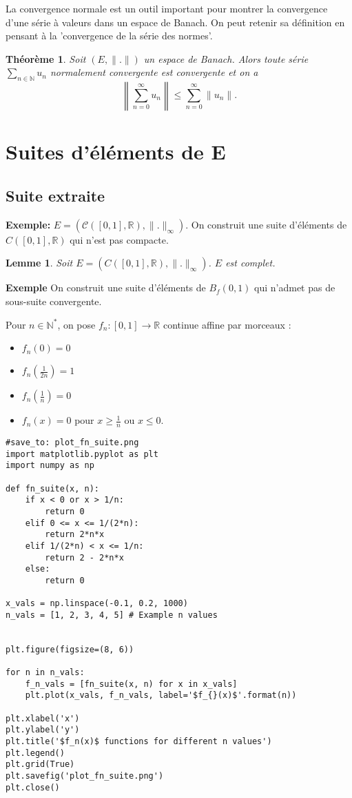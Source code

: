 \documentclass{article}
\newtheorem{theorem}{Théorème}
\newtheorem{lemma}{Lemme}
\begin{document}
La convergence normale est un outil important pour montrer la convergence d'une série à valeurs dans un espace de Banach. On peut retenir sa définition en pensant à la 'convergence de la série des normes'.

\begin{theorem}
\label{thm:normal_convergence_implies_convergence}
Soit $(E, \|.\|)$ un espace de Banach. Alors toute série $\sum_{n \in \mathbb{N}} u_n$ normalement convergente est convergente et on a
\begin{equation}
    \left\| \sum_{n=0}^\infty u_n \right\| \leq \sum_{n=0}^\infty \|u_n\|.
\end{equation}
\end{theorem}

\section{Suites d'éléments de E}
\subsection{Suite extraite}
\textbf{Exemple:} $E = (\mathcal{C}([0, 1], \mathbb{R}), \|.\|_\infty)$. On construit une suite d'éléments de $C([0, 1], \mathbb{R})$ qui n'est pas compacte.

\begin{lemma}
\label{lemma:C_complete}
Soit $E = (C([0, 1], \mathbb{R}), \|.\|_\infty)$. $E$ est complet.
\end{lemma}

\textbf{Exemple}
On construit une suite d'éléments de $B_f(0, 1)$ qui n'admet pas de sous-suite convergente.

Pour $n \in \mathbb{N}^*$, on pose $f_n : [0, 1] \rightarrow \mathbb{R}$ continue affine par morceaux :
\begin{itemize}
    \item $f_n(0) = 0$
    \item $f_n(\frac{1}{2n}) = 1$
    \item $f_n(\frac{1}{n}) = 0$
    \item $f_n(x) = 0$ pour $x \geq \frac{1}{n}$ ou $x \leq 0$.
\end{itemize}

\begin{verbatim}
#save_to: plot_fn_suite.png
import matplotlib.pyplot as plt
import numpy as np

def fn_suite(x, n):
    if x < 0 or x > 1/n:
        return 0
    elif 0 <= x <= 1/(2*n):
        return 2*n*x
    elif 1/(2*n) < x <= 1/n:
        return 2 - 2*n*x
    else:
        return 0

x_vals = np.linspace(-0.1, 0.2, 1000)
n_vals = [1, 2, 3, 4, 5] # Example n values


plt.figure(figsize=(8, 6))

for n in n_vals:
    f_n_vals = [fn_suite(x, n) for x in x_vals]
    plt.plot(x_vals, f_n_vals, label='$f_{}(x)$'.format(n))

plt.xlabel('x')
plt.ylabel('y')
plt.title('$f_n(x)$ functions for different n values')
plt.legend()
plt.grid(True)
plt.savefig('plot_fn_suite.png')
plt.close()

\end{verbatim}
\end{document}
